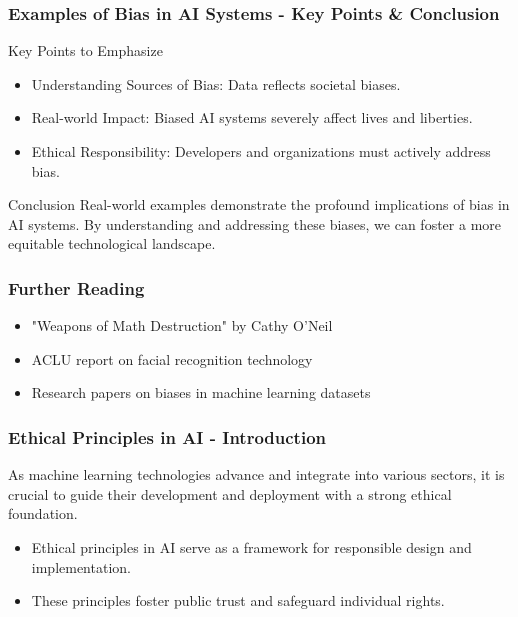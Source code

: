 \documentclass{beamer}
\begin{document}
\begin{frame}[fragile]
    \frametitle{Examples of Bias in AI Systems - Key Points & Conclusion}
    \begin{block}{Key Points to Emphasize}
        \begin{itemize}
            \item Understanding Sources of Bias: Data reflects societal biases.
            \item Real-world Impact: Biased AI systems severely affect lives and liberties.
            \item Ethical Responsibility: Developers and organizations must actively address bias.
        \end{itemize}
    \end{block}
    
    \begin{block}{Conclusion}
        Real-world examples demonstrate the profound implications of bias in AI systems. 
        By understanding and addressing these biases, we can foster a more equitable technological landscape.
    \end{block}
\end{frame}

\begin{frame}[fragile]
    \frametitle{Further Reading}
    \begin{itemize}
        \item "Weapons of Math Destruction" by Cathy O'Neil
        \item ACLU report on facial recognition technology
        \item Research papers on biases in machine learning datasets
    \end{itemize}
\end{frame}

\begin{frame}[fragile]
    \frametitle{Ethical Principles in AI - Introduction}
    As machine learning technologies advance and integrate into various sectors, it is crucial to guide their development and deployment with a strong ethical foundation. 
    \begin{itemize}
        \item Ethical principles in AI serve as a framework for responsible design and implementation.
        \item These principles foster public trust and safeguard individual rights.
    \end{itemize}
\end{frame}
\end{document}

